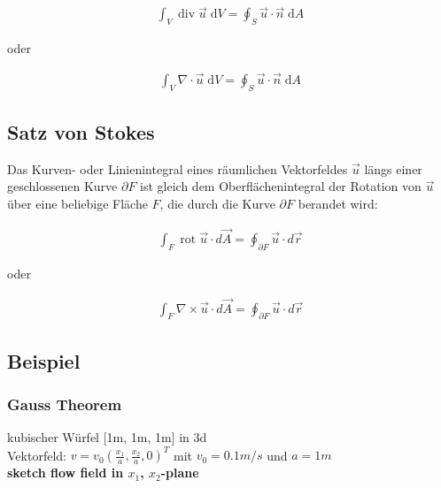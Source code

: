 \documentclass[a4paper]{scrartcl}
\begin{document}
\begin{align}
\int_V \operatorname{div} \vec u \; \mathrm dV = \oint_{S} \vec u \cdot
\vec n\; \mathrm dA
\end{align}

oder

\begin{align}
\int_V \nabla \cdot \vec u \; \mathrm dV = \oint_{S} \vec u \cdot
\vec n\; \mathrm dA
\end{align}

\subsection{Satz von Stokes}
Das Kurven- oder Linienintegral eines räumlichen Vektorfeldes $\vec u$ längs
einer geschlossenen Kurve $\partial F$ ist gleich dem Oberflächenintegral der
Rotation von $\vec u$ über eine beliebige Fläche $F$, die durch die Kurve
$\partial F$ berandet wird:

\begin{align}
 \int_{F} \operatorname{rot} \vec u \cdot d \vec A =
\oint_{\partial F} \vec u \cdot d \vec r
\end{align}

oder

\begin{align}
 \int_{F} \nabla \times \vec u \cdot d \vec A =
\oint_{\partial F} \vec u \cdot d \vec r
\end{align}

\subsection{Beispiel} %

\subsubsection{Gauss Theorem}
kubischer Würfel [1m, 1m, 1m] in 3d\\
Vektorfeld: $v = v_0 (\frac{x_1}{a}, \frac{x_2}{a}, 0)^T$ mit $v_0 = 0.1 m/s$
und $a = 1m$\\

\textbf{sketch flow field in $x_1$, $x_2$-plane}\\
\end{document}
